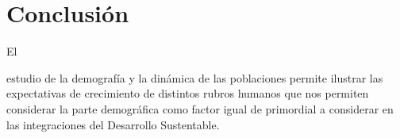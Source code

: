 \documentclass[stu, 12pt, letterpaper, donotrepeattitle, floatsintext, natbib]{apa7}
\begin{document}
\section*{Conclusión}
El \begin{justifying}
    estudio de la demografía y la dinámica de las poblaciones permite ilustrar las expectativas de crecimiento de distintos
    rubros humanos que nos permiten considerar la parte demográfica como factor igual de primordial a considerar en las integraciones del
    Desarrollo Sustentable.\par
\end{justifying}
\newpage
\setcounter{secnumdepth}{0} %
\renewcommand\refname{\textbf{Referencias}}
\end{document}
